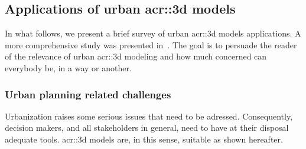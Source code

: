     \subsection{Applications of urban \acrshort{acr::3d} models}
        \label{subsec::introduction::urban_3d_reconstruction::applications}
        In what follows, we present a brief survey of  urban \gls{acr::3d} models applications.
        A more comprehensive study was presented in~\textcite{ijgi4042842}.
        The goal is to persuade the reader of the relevance of urban \gls{acr::3d} modeling and how much concerned can everybody be, in a way or another.
        \subsubsection{Urban planning related challenges}
        Urbanization raises some serious issues that need to be adressed.
        Consequently, decision makers, and all stakeholders in general, need to have at their disposal adequate tools.
        \gls{acr::3d} models are, in this sense, suitable as shown hereafter.\\

